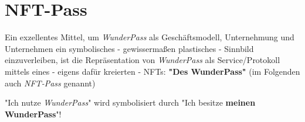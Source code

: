 
\section{NFT-Pass}
\label{sec:nft-pass}


Ein exzellentes Mittel, um \textit{WunderPass} als Geschäftsmodell, Unternehmung und Unternehmen ein symbolisches - gewissermaßen plastisches - Sinnbild einzuverleiben, ist die Repräsentation von \textit{WunderPass} als Service/Protokoll mittels eines - eigens dafür kreierten - NFTs: \textbf{"Des WunderPass"} (im Folgenden auch \textit{NFT-Pass} genannt)

\vspace{0.3cm}

\begin{Fazit}

"Ich nutze \textit{WunderPass}" wird symbolisiert durch "Ich besitze \textbf{meinen WunderPass}"!

\end{Fazit}

\vspace{0.3cm}








\vspace{0.5cm}